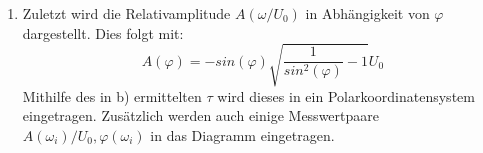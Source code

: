 \begin{enumerate}
       \item Zuletzt wird die Relativamplitude $A(\omega / U_0)$ in Abhängigkeit von $\varphi$ dargestellt.
       Dies folgt mit:
       \begin{equation}
         A(\varphi) = -sin(\varphi)\sqrt{\frac{1}{sin^2(\varphi)}-1}U_0
       \end{equation}
       Mithilfe des in b) ermittelten $\tau$ wird dieses in ein Polarkoordinatensystem eingetragen.
       Zusätzlich werden auch einige Messwertpaare ${A(\omega_i)/U_0,\varphi(\omega_i)}$ in das Diagramm
        eingetragen.

\end{enumerate}
